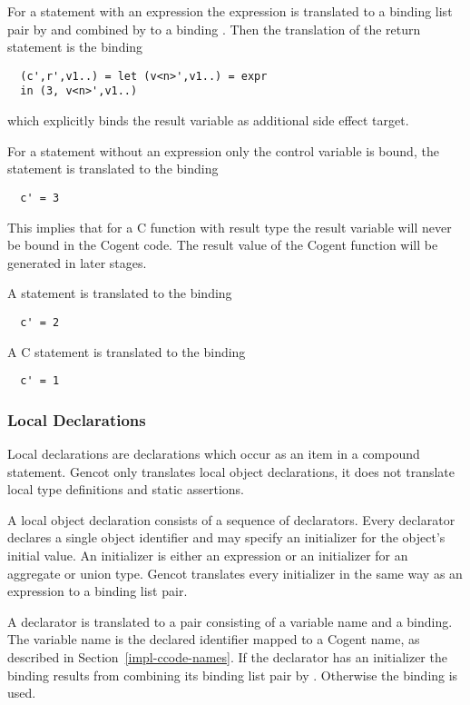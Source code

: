 For a  statement with an expression the expression is translated to a binding list pair by  and 
combined by  to a binding . Then the translation of the return statement
is the binding
\begin{verbatim}
  (c',r',v1..) = let (v<n>',v1..) = expr
  in (3, v<n>',v1..)
\end{verbatim}
which explicitly binds the result variable  as additional side effect target. 

For a  statement without an expression only the control variable is bound, the statement is translated to the 
binding
\begin{verbatim}
  c' = 3
\end{verbatim}
This implies that for a C function with result type  the result variable will never be bound in
the Cogent code. The result value of the Cogent function will be generated in later stages.

A  statement is translated to the binding
\begin{verbatim}
  c' = 2
\end{verbatim}

A C  statement is translated to the binding
\begin{verbatim}
  c' = 1
\end{verbatim}

\subsubsection{Local Declarations}

Local declarations are declarations which occur as an item in a compound statement. Gencot only translates local object declarations, 
it does not translate local type definitions and static assertions. 

A local object declaration consists of a sequence of declarators. Every declarator declares a single object identifier and may 
specify an initializer for the object's initial value. An initializer is either an expression or an initializer for an aggregate or
union type. Gencot translates every initializer in the same way as an expression to a binding list pair.

A declarator is translated to a pair consisting of a variable name and a binding. The variable name is the declared identifier
mapped to a Cogent name, as described in Section~\ref{impl-ccode-names}. If the declarator has an initializer the binding
results from combining its binding list pair by . Otherwise the binding  is used.

